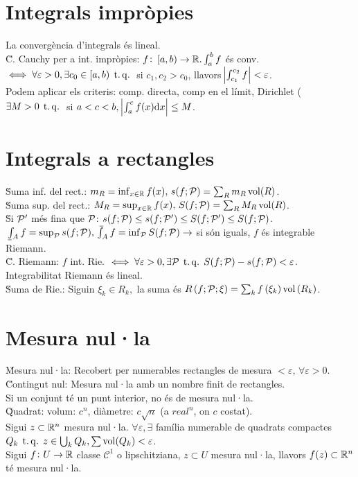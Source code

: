\section{Integrals impròpies}

\ci La convergència d'integrals és lineal. \\
\u{C. Cauchy per a int. impròpies}: $f\colon \left[a, b\right) \to \mathbb{R}. \int_a^b f$ és conv. $\iff \forall \varepsilon > 0, \exists c_0 \in \left[a, b\right) \operatorname{\;t.q.\;}$ si $c_1, c_2 > c_0$, llavors $\abs{\int_{c_1}^{c_2} f} < \varepsilon$. \\
\ci Podem aplicar els criteris: comp. directa, comp en el límit, Dirichlet ($\exists M>0 \operatorname{\;t.q.\;}$ si $a<c<b,\, \abs{\int_a^c f(x) \text{d}x} \leq M$.

\section{Integrals a rectangles}

\u{Suma inf. del rect.}: $m_R = \inf_{x\in\mathbb{R}} f(x), \, s(f; \mathcal{P}) = \sum_R m_R \operatorname{vol}(R)$. \\
\u{Suma sup. del rect.}: $M_R = \sup_{x\in\mathbb{R}} f(x), \, S(f; \mathcal{P}) = \sum_R M_R \operatorname{vol}(R)$. \\
\u{Si $\mathcal{P}'$ més fina que $\mathcal{P}$}: $s(f; \mathcal{P}) \leq s(f; \mathcal{P}') \leq S(f; \mathcal{P}') \leq S(f; \mathcal{P})$. \\
\ci $\lowint_A f = \sup_\Pa s(f; \Pa), \upint_A f = \inf_\Pa S(f; \Pa) \to$ si són iguals, $f$ és integrable Riemann.\\
\u{C. Riemann}: $f$ int. Rie. $\iff \forall \varepsilon>0, \exists\mathcal{P} \operatorname{\;t.q.\;} S(f;\mathcal{P}) - s(f;\mathcal{P}) < \varepsilon$.\\
\ci Integrabilitat Riemann és lineal. \\
\u{Suma de Rie.}: Siguin $\xi_k \in R_k,$ la suma és $R\left( f;\mathcal{P}; \xi\right) = \sum_k f\left( \xi_k\right) \operatorname{vol}\left( R_k\right)$.

\section{Mesura nul·la}

\u{Mesura nul·la}: Recobert per numerables rectangles de mesura $< \varepsilon, \, \forall \varepsilon > 0$. \\
\u{Contingut nul}: Mesura nul·la amb un nombre finit de rectangles. \\
\ci Si un conjunt té un punt interior, no és de mesura nul·la. \\
\u{Quadrat}: volum: $c^n$, diàmetre: $c\sqrt{n}$ (a $real^n$, on $c$ costat). \\
\ci Sigui $z \subset \mathbb{R}^n$ mesura nul·la. $\forall \varepsilon, \exists$ família numerable de quadrats compactes $Q_k \operatorname{\;t.q.\;} z\in\bigcup_k Q_k, \sum\operatorname{vol}(Q_k) < \varepsilon$. \\
\ci Sigui $f\colon U\to \mathbb{R}$ classe $\mathcal{C}^1$ o lipschitziana, $z \subset U$ mesura nul·la, llavors $f(z) \subset \mathbb{R}^n$ té mesura nul·la.

